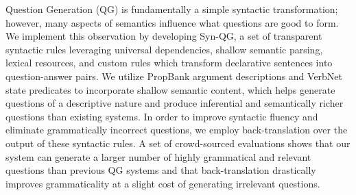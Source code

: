 Question Generation (QG) is fundamentally a simple syntactic transformation; however, many aspects of semantics influence what questions are good to form. We implement this observation by developing Syn-QG, a set of transparent syntactic rules leveraging universal dependencies, shallow semantic parsing, lexical resources, and custom rules which transform declarative sentences into question-answer pairs. We utilize PropBank argument descriptions and VerbNet state predicates to incorporate shallow semantic content, which helps generate questions of a descriptive nature and produce inferential and semantically richer questions than existing systems. In order to improve syntactic fluency and eliminate grammatically incorrect questions, we employ back-translation over the output of these syntactic rules. A set of crowd-sourced evaluations shows that our system can generate a larger number of highly grammatical and relevant questions than previous QG systems and that back-translation drastically improves grammaticality at a slight cost of generating irrelevant questions.
